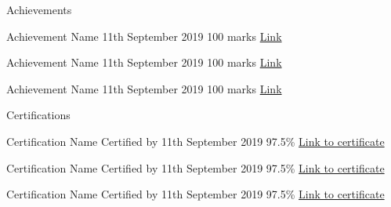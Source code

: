 \documentclass{resume} %
\begin{document}

\begin{rSection}{Achievements}
    \begin{rSubsectionNoBullet}
    {Achievement Name}
    {11th September 2019}
    {100 marks}
    {\href{www.proof.com}{Link}}\item \vspace{-1.5em}
    \end{rSubsectionNoBullet}

    \begin{rSubsectionNoBullet}
    {Achievement Name}
    {11th September 2019}
    {100 marks}
    {\href{www.proof.com}{Link}}\item \vspace{-1.5em}
    \end{rSubsectionNoBullet}

    \begin{rSubsectionNoBullet}
    {Achievement Name}
    {11th September 2019}
    {100 marks}
    {\href{www.proof.com}{Link}}\item
    \end{rSubsectionNoBullet}
\end{rSection}


\begin{rSection}{Certifications}
    \begin{rSubsectionNoBullet}
    {Certification Name \vline \hspace{2pt} Certified by}
    {11th September 2019}
    {97.5\%}
    {\href{www.proof.com}{Link to certificate}}\item \vspace{-1.5em}
    \end{rSubsectionNoBullet}

    \begin{rSubsectionNoBullet}
    {Certification Name \vline \hspace{2pt} Certified by}
    {11th September 2019}
    {97.5\%}
    {\href{www.proof.com}{Link to certificate}}\item \vspace{-1.5em}
    \end{rSubsectionNoBullet}

    \begin{rSubsectionNoBullet}
    {Certification Name \vline \hspace{2pt} Certified by}
    {11th September 2019}
    {97.5\%}
    {\href{www.proof.com}{Link to certificate}}\item
    
    \end{rSubsectionNoBullet}
\end{rSection}
\end{document}
